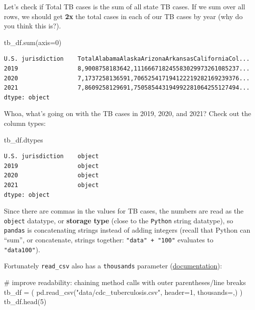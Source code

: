 \documentclass[
  letterpaper,
  DIV=11,
  numbers=noendperiod]{scrreprt}
\newenvironment{Shaded}{\begin{snugshade}}{\end{snugshade}}
\newcommand{\BuiltInTok}[1]{\textcolor[rgb]{0.00,0.23,0.31}{#1}}
\newcommand{\CommentTok}[1]{\textcolor[rgb]{0.37,0.37,0.37}{#1}}
\newcommand{\DecValTok}[1]{\textcolor[rgb]{0.68,0.00,0.00}{#1}}
\newcommand{\NormalTok}[1]{\textcolor[rgb]{0.00,0.23,0.31}{#1}}
\newcommand{\OperatorTok}[1]{\textcolor[rgb]{0.37,0.37,0.37}{#1}}
\newcommand{\StringTok}[1]{\textcolor[rgb]{0.13,0.47,0.30}{#1}}
\begin{document}
Let's check if Total TB cases is the sum of all state TB cases. If we
sum over all rows, we should get \textbf{2x} the total cases in each of
our TB cases by year (why do you think this is?).

\begin{Shaded}
\begin{Highlighting}[]
\NormalTok{tb\_df.}\BuiltInTok{sum}\NormalTok{(axis}\OperatorTok{=}\DecValTok{0}\NormalTok{)}
\end{Highlighting}
\end{Shaded}

\begin{verbatim}
U.S. jurisdiction    TotalAlabamaAlaskaArizonaArkansasCaliforniaCol...
2019                 8,9008758183642,111666718245583029973261085237...
2020                 7,1737258136591,706525417194122219282169239376...
2021                 7,8609258129691,750585443194992281064255127494...
dtype: object
\end{verbatim}

Whoa, what's going on with the TB cases in 2019, 2020, and 2021? Check
out the column types:

\begin{Shaded}
\begin{Highlighting}[]
\NormalTok{tb\_df.dtypes}
\end{Highlighting}
\end{Shaded}

\begin{verbatim}
U.S. jurisdiction    object
2019                 object
2020                 object
2021                 object
dtype: object
\end{verbatim}

Since there are commas in the values for TB cases, the numbers are read
as the \texttt{object} datatype, or \textbf{storage type} (close to the
\texttt{Python} string datatype), so \texttt{pandas} is concatenating
strings instead of adding integers (recall that Python can ``sum'', or
concatenate, strings together: \texttt{"data"\ +\ "100"} evaluates to
\texttt{"data100"}).

Fortunately \texttt{read\_csv} also has a \texttt{thousands} parameter
(\href{https://pandas.pydata.org/docs/reference/api/pandas.read_csv.html}{documentation}):

\begin{Shaded}
\begin{Highlighting}[]
\CommentTok{\# improve readability: chaining method calls with outer parentheses/line breaks}
\NormalTok{tb\_df }\OperatorTok{=}\NormalTok{ (}
\NormalTok{    pd.read\_csv(}\StringTok{"data/cdc\_tuberculosis.csv"}\NormalTok{, header}\OperatorTok{=}\DecValTok{1}\NormalTok{, thousands}\OperatorTok{=}\StringTok{\textquotesingle{},\textquotesingle{}}\NormalTok{)}
\NormalTok{)}
\NormalTok{tb\_df.head(}\DecValTok{5}\NormalTok{)}
\end{Highlighting}
\end{Shaded}
\end{document}
